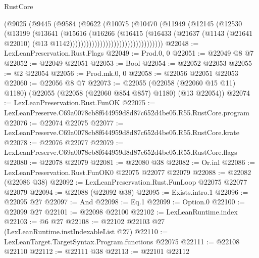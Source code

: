 \begin{lexlean}{RustCore}
\begin{coremodule}
                                    (@9025
                                      (@9445
                                        (@9584
                                          (@9622
                                            (@10075
                                              (@10470
                                                (@11949
                                                  (@12145
                                                    (@12530
                                                      (@13199
                                                        (@13641
                                                          (@15616
                                                            (@16266
                                                              (@16415
                                                                (@16433
                                                                  (@21637
                                                                    (@1143
                                                                      (@21641 @22010)
                                                                      (@13
                                                                        @1142))))))))))))))))))))))))))))))))))
@22048 := LexLeanPreservation.Rust.Flags
@22049 := Prod.{0, 0}
@22051 := @22049 @8 @7
@22052 := @22049 @22051
@22053 := Bool
@22054 := @22052 @22053
@22055 := @2 @22054
@22056 := Prod.mk.{0, 0}
@22058 := @22056 @22051 @22053
@22060 := @22056 @8 @7
@22073 := @22055
    (@22058 (@22060 @15 @11) @1180)
    (@22055 (@22058 (@22060 @854 @857) @1180) (@13 @22054))
@22074 := LexLeanPreservation.Rust.FunOK
@22075 := LexLeanPreserve.C69a0078cb8f644959d8d87c652d4be05.R55.RustCore.program
@22076 := @22074 @22075
@22077 := LexLeanPreserve.C69a0078cb8f644959d8d87c652d4be05.R55.RustCore.krate
@22078 := @22076 @22077
@22079 := LexLeanPreserve.C69a0078cb8f644959d8d87c652d4be05.R55.RustCore.flags
@22080 := @22078 @22079
@22081 := @22080 @38
@22082 := Or.inl
@22086 := LexLeanPreservation.Rust.FunOK0 @22075 @22077 @22079
@22088 := @22082 (@22086 @38)
@22092 := LexLeanPreservation.Rust.FunLoop @22075 @22077 @22079
@22094 := @22088 (@22092 @38)
@22095 := Exists.intro.{1}
@22096 := @22095 @27
@22097 := And
@22098 := Eq.{1}
@22099 := Option.{0}
@22100 := @22099 @27
@22101 := @22098 @22100
@22102 := LexLeanRuntime.index
@22103 := @6 @27
@22108 := @22102 @22103 @27 (LexLeanRuntime.instIndexableList @27)
@22110 := LexLeanTarget.TargetSyntax.Program.functions @22075
@22111 := @22108 @22110
@22112 := @22111 @38
@22113 := @22101 @22112

\end{coremodule}
\end{lexlean}
